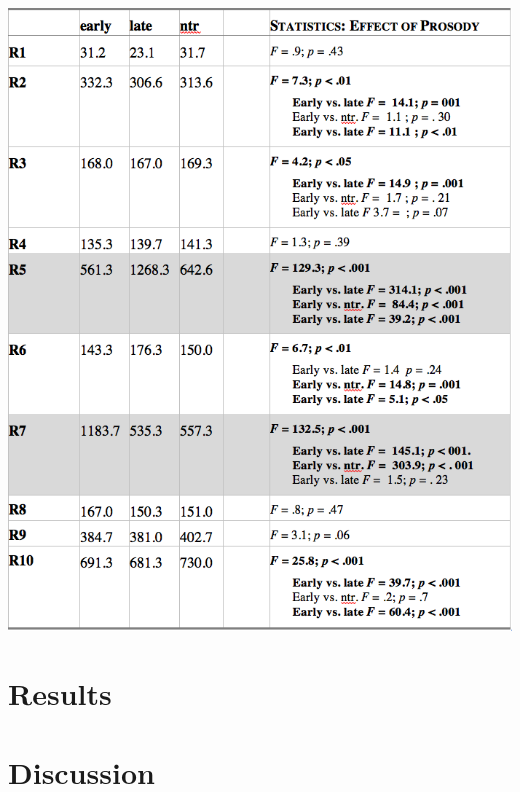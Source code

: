\documentclass[fleqn,reqno,10pt,draft]{article}
\begin{document}
\begin{table}
  \centering
  
  \includegraphics[width=\textwidth]{../pictures/Acoustics/Table-D.png}

  \caption{???}  
  \label{tab:table-D}
\end{table}



\section{Results}
\label{sec:results}

\lipsum[1]

\section{Discussion}
\label{sec:discussion}

\lipsum[1]





\printbibliography[heading=bibintoc]
\end{document}
